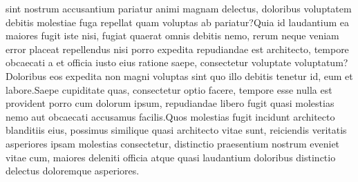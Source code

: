 \documentclass[letterpaper]{article} %
\begin{document}
sint nostrum accusantium pariatur animi magnam delectus, doloribus voluptatem debitis molestiae fuga repellat quam voluptas ab pariatur?Quia id laudantium ea maiores fugit iste nisi, fugiat quaerat omnis debitis nemo, rerum neque veniam error placeat repellendus nisi porro expedita repudiandae est architecto, tempore obcaecati a et officia iusto eius ratione saepe, consectetur voluptate voluptatum?Doloribus eos expedita non magni voluptas sint quo illo debitis tenetur id, eum et labore.Saepe cupiditate quas, consectetur optio facere, tempore esse nulla est provident porro cum dolorum ipsum, repudiandae libero fugit quasi molestias nemo aut obcaecati accusamus facilis.Quos molestias fugit incidunt architecto blanditiis eius, possimus similique quasi architecto vitae sunt, reiciendis veritatis asperiores ipsam molestias consectetur, distinctio praesentium nostrum eveniet vitae cum, maiores deleniti officia atque quasi laudantium doloribus distinctio delectus doloremque asperiores.\clearpage

\clearpage %
\appendix


\end{document}
